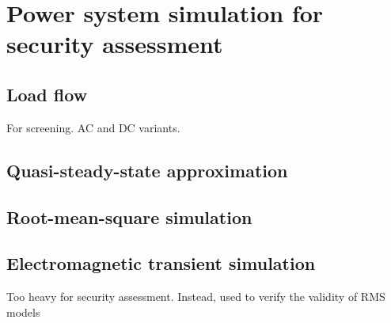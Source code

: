 \chapter{Power system simulation for security assessment}

\section{Load flow}
For screening. AC and DC variants.
\section{Quasi-steady-state approximation}
\section{Root-mean-square simulation}
\section{Electromagnetic transient simulation}
Too heavy for security assessment. Instead, used to verify the validity of RMS models